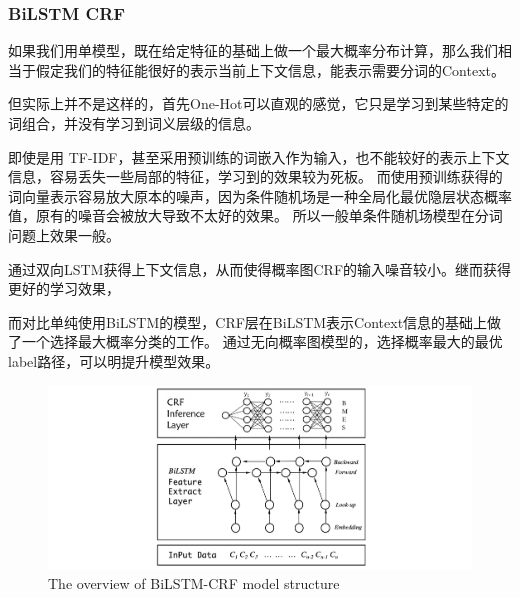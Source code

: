 \subsubsection{BiLSTM CRF}
\label{sec:bilstm_crf}

如果我们用单模型，既在给定特征的基础上做一个最大概率分布计算，那么我们相当于假定我们的特征能很好的表示当前上下文信息，能表示需要分词的Context。

但实际上并不是这样的，首先One-Hot可以直观的感觉，它只是学习到某些特定的词组合，并没有学习到词义层级的信息。

即使是用 TF-IDF，甚至采用预训练的词嵌入作为输入，也不能较好的表示上下文信息，容易丢失一些局部的特征，学习到的效果较为死板。
而使用预训练获得的词向量表示容易放大原本的噪声，因为条件随机场是一种全局化最优隐层状态概率值，原有的噪音会被放大导致不太好的效果。
所以一般单条件随机场模型在分词问题上效果一般。

通过双向LSTM获得上下文信息，从而使得概率图CRF的输入噪音较小。继而获得更好的学习效果，

而对比单纯使用BiLSTM的模型，CRF层在BiLSTM表示Context信息的基础上做了一个选择最大概率分类的工作。
通过无向概率图模型的，选择概率最大的最优label路径，可以明提升模型效果。


\begin{figure}[htbp!]
    \begin{center}
    \includegraphics[width=1\textwidth]{figures/model.pdf}
    \end{center}
    \caption{The overview of BiLSTM-CRF model structure}
    \label{fig:overall_model}
\end{figure}